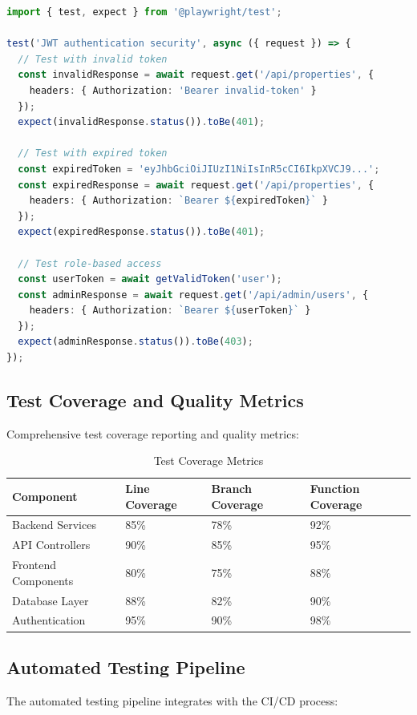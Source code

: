 \documentclass[conference]{IEEEtran}
\begin{document}
\begin{lstlisting}[language=TypeScript, caption=Security Test Example]
import { test, expect } from '@playwright/test';

test('JWT authentication security', async ({ request }) => {
  // Test with invalid token
  const invalidResponse = await request.get('/api/properties', {
    headers: { Authorization: 'Bearer invalid-token' }
  });
  expect(invalidResponse.status()).toBe(401);
  
  // Test with expired token
  const expiredToken = 'eyJhbGciOiJIUzI1NiIsInR5cCI6IkpXVCJ9...';
  const expiredResponse = await request.get('/api/properties', {
    headers: { Authorization: `Bearer ${expiredToken}` }
  });
  expect(expiredResponse.status()).toBe(401);
  
  // Test role-based access
  const userToken = await getValidToken('user');
  const adminResponse = await request.get('/api/admin/users', {
    headers: { Authorization: `Bearer ${userToken}` }
  });
  expect(adminResponse.status()).toBe(403);
});
\end{lstlisting}

\subsection{Test Coverage and Quality Metrics}
Comprehensive test coverage reporting and quality metrics:

\begin{table}[ht]
\centering
\caption{Test Coverage Metrics}
\begin{tabular}{|l|l|l|l|}
\hline
\textbf{Component} & \textbf{Line Coverage} & \textbf{Branch Coverage} & \textbf{Function Coverage} \\
\hline
Backend Services & 85\% & 78\% & 92\% \\
\hline
API Controllers & 90\% & 85\% & 95\% \\
\hline
Frontend Components & 80\% & 75\% & 88\% \\
\hline
Database Layer & 88\% & 82\% & 90\% \\
\hline
Authentication & 95\% & 90\% & 98\% \\
\hline
\end{tabular}
\end{table}

\subsection{Automated Testing Pipeline}
The automated testing pipeline integrates with the CI/CD process:
\end{document}
